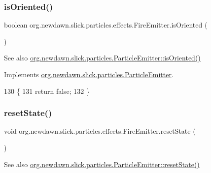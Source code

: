 \subsubsection{\texorpdfstring{is\+Oriented()}{isOriented()}}
{\footnotesize\ttfamily boolean org.\+newdawn.\+slick.\+particles.\+effects.\+Fire\+Emitter.\+is\+Oriented (\begin{DoxyParamCaption}{ }\end{DoxyParamCaption})\hspace{0.3cm}{\ttfamily [inline]}}

\begin{DoxySeeAlso}{See also}
\mbox{\hyperlink{interfaceorg_1_1newdawn_1_1slick_1_1particles_1_1_particle_emitter_a4a51564b4539a1eb2c3fc0d322ac5c2a}{org.\+newdawn.\+slick.\+particles.\+Particle\+Emitter\+::is\+Oriented()}} 
\end{DoxySeeAlso}


Implements \mbox{\hyperlink{interfaceorg_1_1newdawn_1_1slick_1_1particles_1_1_particle_emitter_a4a51564b4539a1eb2c3fc0d322ac5c2a}{org.\+newdawn.\+slick.\+particles.\+Particle\+Emitter}}.


\begin{DoxyCode}
130                                 \{
131         \textcolor{keywordflow}{return} \textcolor{keyword}{false};
132     \}
\end{DoxyCode}
\mbox{\label{classorg_1_1newdawn_1_1slick_1_1particles_1_1effects_1_1_fire_emitter_a8caebb6bf21a766da28469533db95b37}} 
\subsubsection{\texorpdfstring{reset\+State()}{resetState()}}
{\footnotesize\ttfamily void org.\+newdawn.\+slick.\+particles.\+effects.\+Fire\+Emitter.\+reset\+State (\begin{DoxyParamCaption}{ }\end{DoxyParamCaption})\hspace{0.3cm}{\ttfamily [inline]}}

\begin{DoxySeeAlso}{See also}
\mbox{\hyperlink{interfaceorg_1_1newdawn_1_1slick_1_1particles_1_1_particle_emitter_a1120925a31c61fc95dc38eca9b01b9ef}{org.\+newdawn.\+slick.\+particles.\+Particle\+Emitter\+::reset\+State()}} 
\end{DoxySeeAlso}


